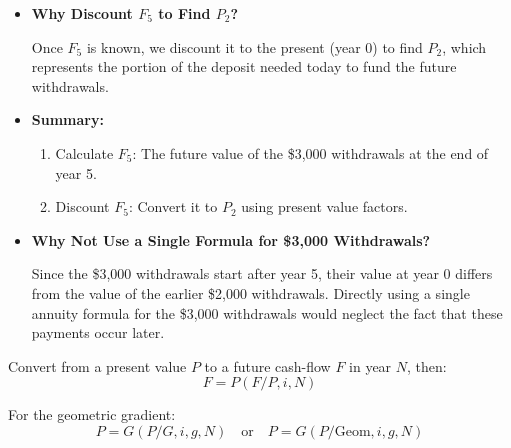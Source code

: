\begin{example}
\begin{itemize}
            \item \textbf{Why Discount $F_5$ to Find $P_2$?} 
            
            Once $F_5$ is known, we discount it to the present (year 0) to find $P_2$, which represents the portion of the deposit needed today to fund the future withdrawals.
            
            \item \textbf{Summary:}
            
            \begin{enumerate}
                \item Calculate $F_5$: The future value of the \$3,000 withdrawals at the end of year 5.
                \item Discount $F_5$: Convert it to $P_2$ using present value factors.
            \end{enumerate}

            \item \textbf{Why Not Use a Single Formula for \$3,000 Withdrawals?}
    
            Since the \$3,000 withdrawals start after year 5, their value at year 0 differs from the value of the earlier \$2,000 withdrawals. Directly using a single annuity formula for the \$3,000 withdrawals would neglect the fact that these payments occur later. 
        \end{itemize}
    \end{example}

    \item Convert from a present value \( P \) to a future cash-flow \( F \) in year \( N \), then:
    \[
    F = P(F/P, i, N)
    \]
    \item For the geometric gradient:
    \[
    P = G(P/G, i, g, N) \quad \text{or} \quad P = G(P/\text{Geom}, i, g, N)
    \]